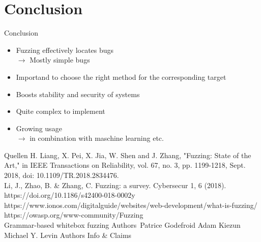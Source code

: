 \documentclass{beamer}
\begin{document}
\section{Conclusion}
\begin{frame}{Conclusion}
 \begin{itemize}
 \item Fuzzing effectively locates bugs\\
 $\rightarrow$ Mostly simple bugs
 \item Importand to choose the right method for the corresponding target
 \item Boosts stability and security of systems
  \item Quite complex to implement\\
  \item Growing usage\\
  $\rightarrow$ in combination with maschine learning etc.
 \end{itemize}

\end{frame}
\begin{frame}{Quellen}
H. Liang, X. Pei, X. Jia, W. Shen and J. Zhang, "Fuzzing: State of the Art," in IEEE Transactions on Reliability, vol. 67, no. 3, pp. 1199-1218, Sept. 2018, doi: 10.1109/TR.2018.2834476.\\
Li, J., Zhao, B. \& Zhang, C. Fuzzing: a survey. Cybersecur 1, 6 (2018). https://doi.org/10.1186/s42400-018-0002\-y\\
https://www.ionos.com/digitalguide/websites/web-development/what-is-fuzzing/\\
https://owasp.org/www-community/Fuzzing\\
Grammar-based whitebox fuzzing
Authors\
Patrice Godefroid
Adam Kiezun
Michael Y. Levin
Authors Info \& Claims


\end{frame}
\end{document}
